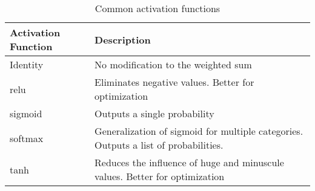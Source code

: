 \begin{table}%
    \centering
    \begin{tabular}{p{4cm}|p{8cm}}
        \textbf{Activation Function} &  \textbf{Description} \\ \hline
        Identity &  No modification to the weighted sum\\
        \gls{relu} & Eliminates negative values. Better for optimization \\
        \gls{sigmoid} & Outputs a single probability \\
        \gls{softmax} & Generalization of \gls{sigmoid} for multiple categories. Outputs a list of probabilities. \\
        \gls{tanh} & Reduces the influence of huge and minuscule values. Better for optimization \\
    \end{tabular}
    \caption{Common activation functions}
    \label{tab:02_nn_common_activation_functions}
\end{table}
